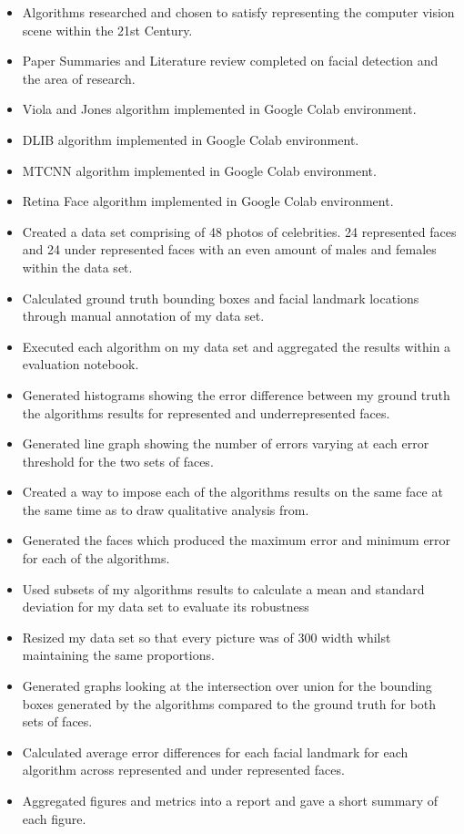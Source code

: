\documentclass[11pt]{article}
\begin{document}
\begin{itemize}
\item Algorithms researched and chosen to satisfy representing the computer vision scene within the 21st Century.
\item Paper Summaries and Literature review completed on facial detection and the area of research.
\item  Viola and Jones algorithm implemented in Google Colab environment.
\item  DLIB algorithm implemented in Google Colab environment.
\item  MTCNN algorithm implemented in Google Colab environment.
\item  Retina Face algorithm implemented in Google Colab environment.
\item  Created a data set comprising of 48 photos of celebrities. 24 represented faces and 24 under represented faces with an even amount of males and females within the data set.
\item  Calculated ground truth bounding boxes and facial landmark locations through manual annotation of my data set.
\item  Executed each algorithm on my data set and aggregated the results within a evaluation notebook.
\item  Generated histograms showing the error difference between my ground truth the algorithms results for represented and underrepresented faces.
\item  Generated line graph showing the number of errors varying at each error threshold for the two sets of faces.
\item  Created a way to impose each of the algorithms results on the same face at the same time as to draw qualitative analysis from.
\item  Generated the faces which produced the maximum error and minimum error for each of the algorithms.
\item  Used subsets of my algorithms results to calculate a mean and standard deviation for my data set to evaluate its robustness
\item  Resized my data set so that every picture was of 300 width whilst maintaining the same proportions.
\item  Generated graphs looking at the intersection over union for the bounding boxes generated by the algorithms compared to the ground truth for both sets of faces.
\item  Calculated average error differences for each facial landmark for each algorithm across represented and under represented faces.
\item  Aggregated figures and metrics into a report and gave a short summary of each figure. 

\end{itemize}
\end{document}
